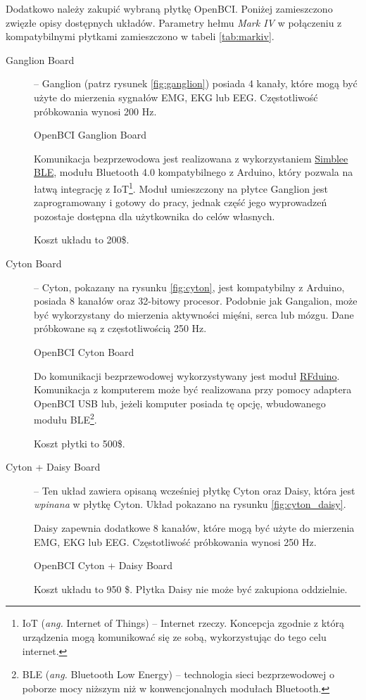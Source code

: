 \documentclass[skorowidz,skroty]{dyplomWEZUT}
\begin{document}
Dodatkowo należy zakupić wybraną płytkę OpenBCI. Poniżej zamieszczono zwięzłe opisy dostępnych układów. Parametry hełmu \textit{Mark IV} w połączeniu z kompatybilnymi płytkami zamieszczono w tabeli \vref{tab:markiv}.

\begin{description}
    \item [Ganglion Board] -- Ganglion (patrz rysunek \vref{fig:ganglion}) posiada 4 kanały, które mogą być użyte do mierzenia sygnałów EMG, EKG lub EEG\cite{ganglion_shop}. Częstotliwość próbkowania wynosi 200 Hz.

    {OpenBCI Ganglion Board\label{fig:ganglion}}
    {\cite{ganglion_shop}}

    Komunikacja bezprzewodowa jest realizowana z wykorzystaniem \href{https://www.sparkfun.com/simblee}{Simblee BLE}, modułu Bluetooth 4.0 kompatybilnego z Arduino, który pozwala na łatwą integrację z IoT\footnote{IoT (\textit{ang.} Internet of Things) -- Internet rzeczy. Koncepcja zgodnie z którą urządzenia mogą komunikować się ze sobą, wykorzystując do tego celu internet.}. Moduł umieszczony na płytce Ganglion jest zaprogramowany i gotowy do pracy, jednak część jego wyprowadzeń pozostaje dostępna dla użytkownika do celów własnych.

    Koszt układu to 200\$.

    \item[Cyton Board] -- Cyton, pokazany na rysunku \vref{fig:cyton}, jest kompatybilny z Arduino, posiada 8 kanałów oraz 32-bitowy procesor\cite{cyton_shop}. Podobnie jak Gangalion, może być wykorzystany do mierzenia aktywności mięśni, serca lub mózgu. Dane próbkowane są z częstotliwością 250 Hz.

    {OpenBCI Cyton Board\label{fig:cyton}}
    {\cite{cyton_shop}}

    Do komunikacji bezprzewodowej wykorzystywany jest moduł \href{https://eu.mouser.com/new/rfdigital/rf-digital-rfduino/}{RFduino}. Komunikacja z komputerem może być realizowana przy pomocy adaptera OpenBCI USB lub, jeżeli komputer posiada tę opcję, wbudowanego modułu BLE\footnote{BLE (\textit{ang.} Bluetooth Low Energy) -- technologia sieci bezprzewodowej o poborze mocy niższym niż w konwencjonalnych modułach Bluetooth.}.

    Koszt płytki to 500\$.

    \item[Cyton + Daisy Board] -- Ten układ zawiera opisaną wcześniej płytkę Cyton oraz Daisy, która jest \textit{wpinana} w płytkę Cyton. Układ pokazano na rysunku \vref{fig:cyton_daisy}.

    Daisy zapewnia dodatkowe 8 kanałów, które mogą być użyte do mierzenia EMG, EKG lub EEG\cite{cytondaisy_shop}. Częstotliwość próbkowania wynosi 250 Hz.

    {OpenBCI Cyton + Daisy Board\label{fig:cyton_daisy}}
    {\cite{cytondaisy_shop}}

    Koszt układu to 950 \$. Płytka Daisy nie może być zakupiona oddzielnie.
\end{description}
\end{document}

